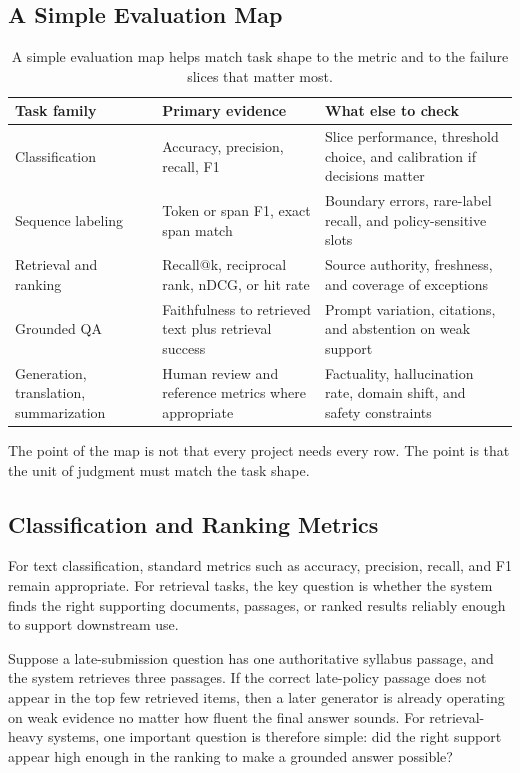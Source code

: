 \subsection{A Simple Evaluation Map}

\begin{table}[t]
\centering
\small
\setlength{\tabcolsep}{4pt}
\renewcommand{\arraystretch}{1.08}
\begin{tabular}{@{}p{2.43cm}p{3.29cm}p{4.51cm}@{}}
\toprule
Task family & Primary evidence & What else to check \\
\midrule
Classification & Accuracy, precision, recall, F1 & Slice performance, threshold choice, and calibration if decisions matter \\
Sequence labeling & Token or span F1, exact span match & Boundary errors, rare-label recall, and policy-sensitive slots \\
Retrieval and ranking & Recall@k, reciprocal rank, nDCG, or hit rate & Source authority, freshness, and coverage of exceptions \\
Grounded QA & Faithfulness to retrieved text plus retrieval success & Prompt variation, citations, and abstention on weak support \\
Generation, translation, summarization & Human review and reference metrics where appropriate & Factuality, hallucination rate, domain shift, and safety constraints \\
\bottomrule
\end{tabular}
\caption{A simple evaluation map helps match task shape to the metric and to the failure slices that matter most.}
\label{tab:nlp-evaluation-map}
\end{table}

The point of the map is not that every project needs every row. The point is that the unit of judgment must match the task shape.

\subsection{Classification and Ranking Metrics}

For text classification, standard metrics such as accuracy, precision, recall, and F1 remain appropriate. For retrieval tasks, the key question is whether the system finds the right supporting documents, passages, or ranked results reliably enough to support downstream use.

\begin{example}
Suppose a late-submission question has one authoritative syllabus passage, and the system retrieves three passages. If the correct late-policy passage does not appear in the top few retrieved items, then a later generator is already operating on weak evidence no matter how fluent the final answer sounds. For retrieval-heavy systems, one important question is therefore simple: did the right support appear high enough in the ranking to make a grounded answer possible?
\end{example}

